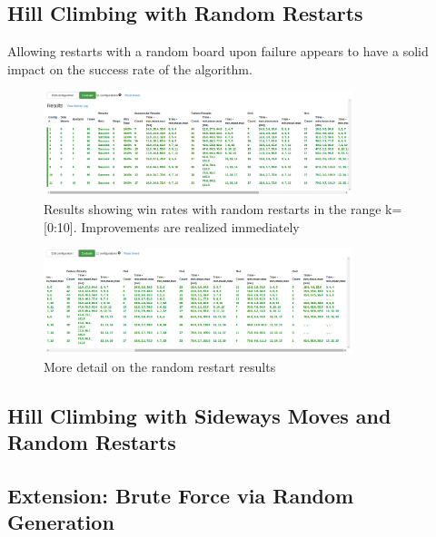 \subsection{Hill Climbing with Random Restarts}
Allowing restarts with a random board upon failure appears to have a solid impact on the success rate of the algorithm.

\begin{figure}[ht!]
\centering
\includegraphics[width=90mm]{img/restart.png}
\caption{Results showing win rates with random restarts in the range k=[0:10]. Improvements are realized immediately}
\label{fig:ui}
\end{figure}

\begin{figure}[ht!]
\centering
\includegraphics[width=90mm]{img/restart2.png}
\caption{More detail on the random restart results}
\label{fig:ui}
\end{figure}

\subsection{Hill Climbing with Sideways Moves and Random Restarts}


\subsection{Extension: Brute Force via Random Generation}

